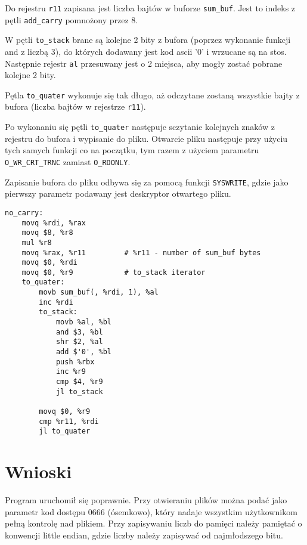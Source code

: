 \documentclass[polish, 11pt]{article}
\begin{document}
		\begin{minipage}{.4\textwidth}
			Do rejestru \texttt{r11} zapisana jest liczba bajtów w buforze \texttt{sum\_buf}.
			Jest to indeks z pętli \texttt{add\_carry} pomnożony przez 8.

			W pętli \texttt{to\_stack} brane są kolejne 2 bity z bufora
			(poprzez wykonanie funkcji and z liczbą 3),
			do których dodawany jest kod ascii '0' i wrzucane są na stos.
			Następnie rejestr \texttt{al} przesuwany jest o 2 miejsca,
			aby mogły zostać pobrane kolejne 2 bity.

			Pętla \texttt{to\_quater} wykonuje się tak długo, aż odczytane zostaną wszystkie bajty z bufora (liczba bajtów w rejestrze \texttt{r11}).

			Po wykonaniu się pętli \texttt{to\_quater} następuje sczytanie kolejnych znaków z rejestru do bufora i wypisanie do pliku.
			Otwarcie pliku następuje przy użyciu tych samych funkcji co na początku,
			tym razem z użyciem parametru \texttt{O\_WR\_CRT\_TRNC} zamiast \texttt{O\_RDONLY}.

			Zapisanie bufora do pliku odbywa się za pomocą funkcji \texttt{SYSWRITE},
			gdzie jako pierwszy parametr podawany jest deskryptor otwartego pliku.

		\end{minipage}%
		\hspace{1cm}
		\begin{minipage}{.5\textwidth}  %
			\begin{lstlisting}
no_carry:
	movq %rdi, %rax
	movq $8, %r8
	mul %r8
	movq %rax, %r11         # %r11 - number of sum_buf bytes
	movq $0, %rdi
	movq $0, %r9            # to_stack iterator
	to_quater:
		movb sum_buf(, %rdi, 1), %al
		inc %rdi
		to_stack:
			movb %al, %bl
			and $3, %bl
			shr $2, %al
			add $'0', %bl
			push %rbx
			inc %r9
			cmp $4, %r9
			jl to_stack

		movq $0, %r9
		cmp %r11, %rdi
		jl to_quater
			\end{lstlisting}  %
		\end{minipage}

	\section{Wnioski}
		Program uruchomił się poprawnie.
		Przy otwieraniu plików można podać jako parametr kod dostępu 0666 (ósemkowo),
		który nadaje wszystkim użytkownikom pełną kontrolę nad plikiem.
		Przy zapisywaniu liczb do pamięci należy pamiętać o konwencji little endian,
		gdzie liczby należy zapisywać od najmłodszego bitu.
\end{document}
